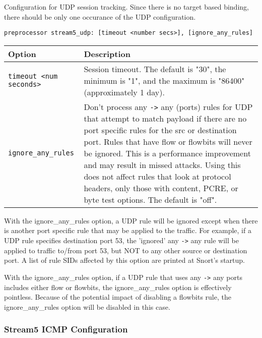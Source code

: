 \documentclass[english]{report}
\newenvironment{note}{
\samepage
    \vspace{10pt}{\textsf{
        {\hspace{7pt}\Huge{$\triangle$\hspace{-12.5pt}{\Large{$^!$}}}}\hspace{5pt}
        {\Large{NOTE}}
    }
    }
   \begin{center}
    \par\vspace{-17pt}

    \begin{lrbox}{\savepar}
    \begin{minipage}[r]{6in}
}
{
    \end{minipage}
    \end{lrbox}
    \fbox{
        \usebox{
            \savepar
	}
    }
    \par\vskip10pt
    \end{center}
}
\newenvironment{note}{
        \begin{rawhtml}
        <p><table border="1"><tr><td><b>
        Note:&nbsp;&nbsp;</b>
        \end{rawhtml}
}{
        \begin{rawhtml}
        </b></td></tr></table></p>
        \end{rawhtml}
}
\begin{document}
Configuration for UDP session tracking.  Since there is no target based
binding, there should be only one occurance of the UDP configuration.

\begin{verbatim}
preprocessor stream5_udp: [timeout <number secs>], [ignore_any_rules]
\end{verbatim}

\begin{tabular}{| l | p{3.5in} |}
\hline
\textbf{Option} & \textbf{Description}\\
\hline 
\hline 
\texttt{timeout <num seconds>} & Session timeout.  The default is "30", the minimum is "1", and the maximum is "86400" (approximately 1 day).\\
\hline
\texttt{ignore\_any\_rules} & Don't process any \texttt{->} any (ports) rules for UDP that attempt to match payload if there are no port specific rules for the src or destination port.  Rules that have flow or flowbits will never be ignored.  This is a performance improvement and may result in missed attacks.  Using this does not affect rules that look at protocol headers, only those with content, PCRE, or byte test options.  The default is "off".\\
\hline
\end{tabular}

\begin{note}
With the ignore\_any\_rules option, a UDP rule will be ignored except when
there is another port specific rule that may be applied to the traffic.  For
example, if a UDP rule specifies destination port 53, the 'ignored' any \texttt{->} any
rule will be applied to traffic to/from port 53, but NOT to any other
source or destination port.  A list of rule SIDs affected by this option
are printed at Snort's startup.
\end{note}

\begin{note}
With the ignore\_any\_rules option, if a UDP rule that uses any \texttt{->} any
ports includes either flow or flowbits, the ignore\_any\_rules option is
effectively pointless.  Because of the potential impact of disabling a flowbits
rule, the ignore\_any\_rules option will be disabled in this case.
\end{note}

\subsubsection{Stream5 ICMP Configuration}
\end{document}
